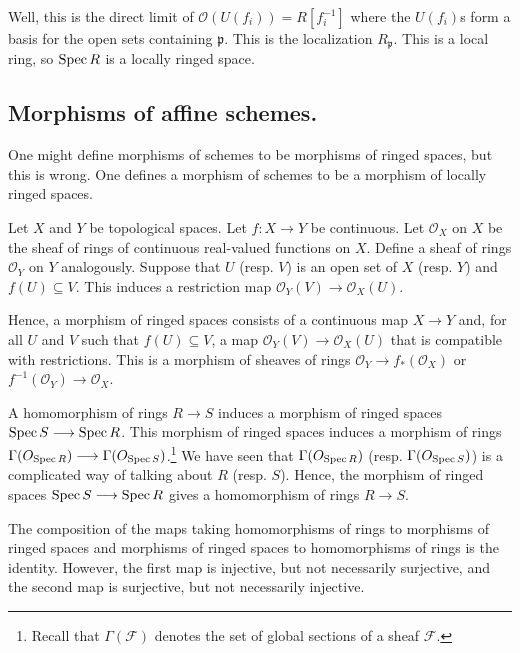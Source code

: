 \documentclass [11 pt, oneside] {article}
\begin{document}
Well, this is the direct limit of $\mathscr{O}(U({f_i}))= R[f_i ^{-1}]$ where the $U({f_i})$s form a basis for the open sets containing $\mathfrak{p}$. This is the localization $R_{\mathfrak{p}}$. This is a local ring, so $\operatorname{Spec} R$ is a locally ringed space.

\subsection{Morphisms of affine schemes.}
One might define morphisms of schemes to be morphisms of ringed spaces, but this is wrong. One defines a morphism of schemes to be a morphism of locally ringed spaces. 

Let $X$ and $Y$ be topological spaces. Let $f:X\longrightarrow Y$ be continuous. Let $\mathscr{O}_X$ on $X$ be the sheaf of rings of continuous real-valued functions on $X$. Define a sheaf of rings $\mathscr{O}_Y$ on $Y$ analogously. Suppose that $U$ (resp. $V$) is an open set of $X$ (resp. $Y$) and $f(U)\subseteq V$. This induces a restriction map $\mathscr{O}_Y(V) \longrightarrow \mathscr{O}_X(U)$.

Hence, a morphism of ringed spaces consists of a continuous map $X\longrightarrow Y$ and, for all $U$ and $V$ such that $f(U)\subseteq V$, a map $\mathscr{O}_Y(V) \longrightarrow \mathscr{O}_X(U)$ that is compatible with restrictions. This is a morphism of sheaves of rings $\mathscr{O}_Y\longrightarrow f_*(\mathscr{O}_X)$ or $f^{-1}(\mathscr{O}_Y)\longrightarrow \mathscr{O}_X$.

A homomorphism of rings $R\longrightarrow S$ induces a morphism of ringed spaces $\operatorname{Spec} S \longrightarrow \operatorname{Spec} R$. This morphism of ringed spaces induces a morphism of rings $\Gamma(\relax{O}_{\operatorname{Spec} R})\longrightarrow \Gamma(\relax{O}_{\operatorname{Spec} S})$.\footnote{Recall that $\Gamma(\mathscr{F})$ denotes the set of global sections of a sheaf $\mathscr{F}$.} We have seen that $\Gamma(\relax{O}_{\operatorname{Spec} R})$ (resp. $\Gamma(\relax{O}_{\operatorname{Spec} S})$) is a complicated way of talking about $R$ (resp. $S$). Hence, the morphism of ringed spaces $\operatorname{Spec} S \longrightarrow \operatorname{Spec} R$ gives a homomorphism of rings $R\longrightarrow S$.

The composition of the maps taking homomorphisms of rings to morphisms of ringed spaces and morphisms of ringed spaces to homomorphisms of rings is the identity. However, the first map is injective, but not necessarily surjective, and the second map is surjective, but not necessarily injective.
\end{document}
